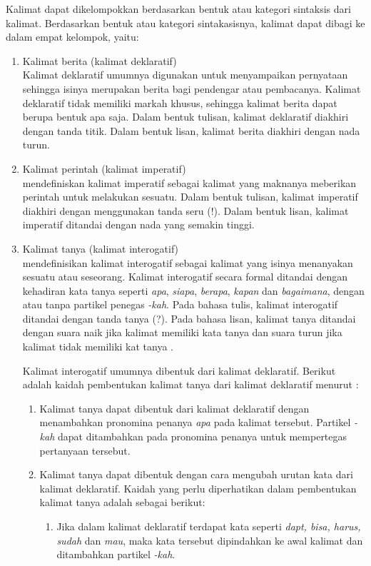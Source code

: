 Kalimat dapat dikelompokkan berdasarkan bentuk atau kategori sintaksis dari kalimat. Berdasarkan bentuk atau kategori sintakasisnya, kalimat dapat dibagi ke dalam empat kelompok, yaitu:
\begin{enumerate}
	\item Kalimat berita (kalimat deklaratif)\\
	Kalimat deklaratif umumnya digunakan untuk menyampaikan pernyataan sehingga isinya merupakan berita bagi pendengar atau pembacanya. Kalimat deklaratif tidak memiliki markah khusus, sehingga kalimat berita dapat berupa bentuk apa saja. Dalam bentuk tulisan, kalimat deklaratif diakhiri dengan tanda titik. Dalam bentuk lisan, kalimat berita diakhiri dengan nada turun.

	\item Kalimat perintah (kalimat imperatif)\\
	\citet{dardjo_et_al} mendefiniskan kalimat imperatif sebagai kalimat yang maknanya meberikan perintah untuk melakukan sesuatu. Dalam bentuk tulisan, kalimat imperatif diakhiri dengan menggunakan tanda seru (!). Dalam bentuk lisan, kalimat imperatif ditandai dengan nada yang semakin tinggi.

	\item Kalimat tanya (kalimat interogatif)\\
	\citet{dardjo_et_al} mendefinisikan kalimat interogatif sebagai kalimat yang isinya menanyakan sesuatu atau seseorang. Kalimat interogatif secara formal ditandai dengan kehadiran kata tanya seperti \emph{apa}, \emph{siapa}, \emph{berapa}, \emph{kapan} dan \emph{bagaimana}, dengan atau tanpa partikel penegas \emph{-kah}. Pada bahasa tulis, kalimat interogatif ditandai dengan tanda tanya (?). Pada bahasa lisan, kalimat tanya ditandai dengan suara naik jika kalimat memiliki kata tanya dan suara turun jika kalimat tidak memiliki kat tanya \citep{alwi}.

	Kalimat interogatif umumnya dibentuk dari kalimat deklaratif. Berikut adalah kaidah pembentukan kalimat tanya dari kalimat deklaratif menurut \citet{alwi}:

	\begin{enumerate}
		\item Kalimat tanya dapat dibentuk dari kalimat deklaratif dengan menambahkan pronomina penanya \emph{apa} pada kalimat tersebut. Partikel \emph{-kah} dapat ditambahkan pada pronomina penanya untuk mempertegas pertanyaan tersebut.

		\item Kalimat tanya dapat dibentuk dengan cara mengubah urutan kata dari kalimat deklaratif. Kaidah yang perlu diperhatikan dalam pembentukan kalimat tanya adalah sebagai berikut:
		\begin{enumerate}
			\item Jika dalam kalimat deklaratif terdapat kata seperti \emph{dapt, bisa, harus, sudah} dan \emph{mau}, maka kata tersebut dipindahkan ke awal kalimat dan ditambahkan partikel \emph{-kah}.


\end{enumerate}
\end{enumerate}
\end{enumerate}
